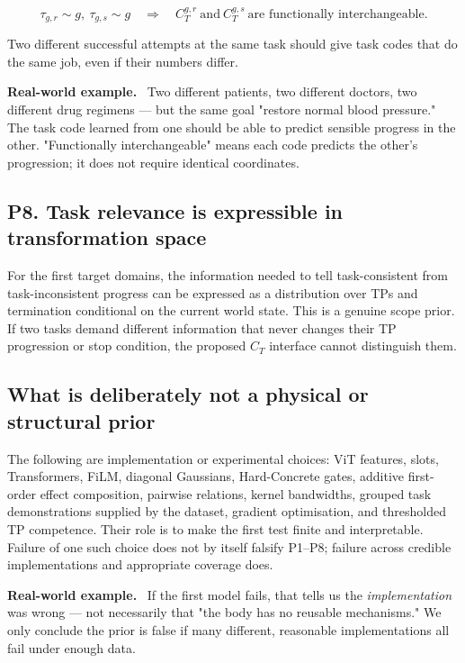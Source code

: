 \documentclass[11pt]{article}
\newenvironment{plainword}{%
  \par\medskip\noindent\begin{minipage}{\textwidth}%
  \color{gray!75!black}\small\itshape
}{%
  \end{minipage}\par\medskip}
\newenvironment{example}{%
  \par\smallskip\noindent\begin{minipage}{\textwidth}%
  \color{teal!60!black}\small
  \textbf{\color{teal!70!black}Real-world example.}\
}{%
  \end{minipage}\par\smallskip}
\begin{document}
\[
\boxed{\tau_{g,r}\sim g,\ \tau_{g,s}\sim g
\quad\Rightarrow\quad
C_T^{g,r}\ \text{and}\ C_T^{g,s}\ \text{are functionally interchangeable}.}
\]

\begin{plainword}
Two different successful attempts at the same task should give task codes that do the same job, even if their numbers differ.
\end{plainword}

\begin{example}
Two different patients, two different doctors, two different drug regimens --- but the same goal "restore normal blood pressure."
The task code learned from one should be able to predict sensible progress in the other. "Functionally interchangeable" means
each code predicts the other's progression; it does not require identical coordinates.
\end{example}

\subsection*{P8. Task relevance is expressible in transformation space}

For the first target domains, the information needed to tell task-consistent from task-inconsistent progress can be expressed as a
distribution over TPs and termination conditional on the current world state. This is a genuine scope prior. If two tasks demand
different information that never changes their TP progression or stop condition, the proposed $C_T$ interface cannot distinguish
them.

\subsection*{What is deliberately not a physical or structural prior}

The following are implementation or experimental choices: ViT features, slots, Transformers, FiLM, diagonal Gaussians,
Hard-Concrete gates, additive first-order effect composition, pairwise relations, kernel bandwidths, grouped task demonstrations
supplied by the dataset, gradient optimisation, and thresholded TP competence. Their role is to make the first test finite and
interpretable. Failure of one such choice does not by itself falsify P1--P8; failure across credible implementations and appropriate
coverage does.

\begin{example}
If the first model fails, that tells us the \emph{implementation} was wrong --- not necessarily that "the body has no reusable
mechanisms." We only conclude the prior is false if many different, reasonable implementations all fail under enough data.
\end{example}
\end{document}
